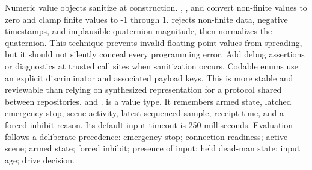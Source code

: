 {}Numeric value objects sanitize at construction. , , and  convert non-finite values to zero and clamp finite values to -1 through 1.  rejects non-finite data, negative timestamps, and implausible quaternion magnitude, then normalizes the quaternion.\markdownRendererParagraphSeparator
{}This technique prevents invalid floating-point values from spreading, but it should not silently conceal every programming error. Add debug assertions or diagnostics at trusted call sites when sanitization occurs.\markdownRendererParagraphSeparator
{}Codable enums use an explicit  discriminator and associated payload keys. This is more stable and reviewable than relying on synthesized representation for a protocol shared between repositories.\markdownRendererInterblockSeparator
{}
\markdownRendererSectionEnd \markdownRendererSectionBegin
{}\markdownRendererInterblockSeparator
{}\markdownRendererBlockQuoteBegin
{}  and .\markdownRendererBlockQuoteEnd \markdownRendererInterblockSeparator
{} is a value type. It remembers armed state, latched emergency stop, scene activity, latest sequenced sample, receipt time, and a forced inhibit reason. Its default input timeout is 250 milliseconds.\markdownRendererParagraphSeparator
{}Evaluation follows a deliberate precedence:\markdownRendererInterblockSeparator
{}\markdownRendererOlBegin
{}emergency stop;\markdownRendererOlItemEnd 
{}connection readiness;\markdownRendererOlItemEnd 
{}active scene;\markdownRendererOlItemEnd 
{}armed state;\markdownRendererOlItemEnd 
{}forced inhibit;\markdownRendererOlItemEnd 
{}presence of input;\markdownRendererOlItemEnd 
{}held dead-man state;\markdownRendererOlItemEnd 
{}input age;\markdownRendererOlItemEnd 
{}drive decision.\markdownRendererOlItemEnd 
\markdownRendererOlEnd \markdownRendererInterblockSeparator
